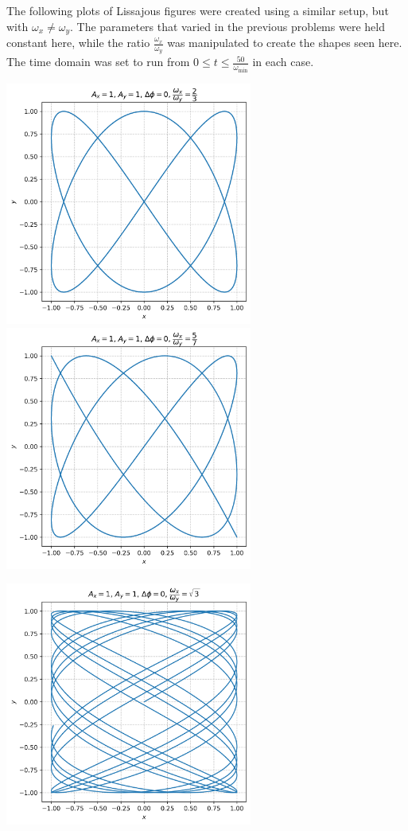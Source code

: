 \documentclass{article}
\begin{document}
The following plots of Lissajous figures were created using a similar setup, but with $\omega_x \neq \omega_y$. The parameters that varied in the previous problems were held constant here, while the ratio $\frac{\omega_x}{\omega_y}$ was manipulated to create the shapes seen here. The time domain was set to run from $0 \leq t \leq \frac{50}{\omega_\text{min}}$ in each case.

\begin{center}
    \includegraphics[width=3.2in]{homework1/lissajous_2-3.png}
    \includegraphics[width=3.2in]{homework1/lissajous_5-7.png}
    
    \includegraphics[width=3.2in]{homework1/lissajous_sqrt3.png}
\end{center}
\end{document}
